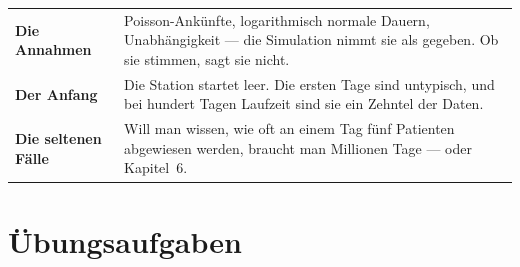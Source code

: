 \begin{warnung}
\begin{center}
{\small
\renewcommand{\arraystretch}{1.52}
\begin{tabular}{@{}P{2.6cm}P{6.0cm}@{}}
\toprule
\textbf{Die Annahmen} & Poisson-Ankünfte, logarithmisch normale Dauern, Unabhängigkeit --- die Simulation nimmt sie als gegeben. Ob sie stimmen, sagt sie nicht.\\
\textbf{Der Anfang} & Die Station startet leer. Die ersten Tage sind untypisch, und bei hundert Tagen Laufzeit sind sie ein Zehntel der Daten.\\
\textbf{Die seltenen Fälle} & Will man wissen, wie oft an einem Tag fünf Patienten abgewiesen werden, braucht man Millionen Tage --- oder Kapitel~6.\\
\bottomrule
\end{tabular}}
\end{center}

\begin{center}
\begin{minipage}{0.88\textwidth}
\end{minipage}
\end{center}
\end{warnung}

\section{Übungsaufgaben}

